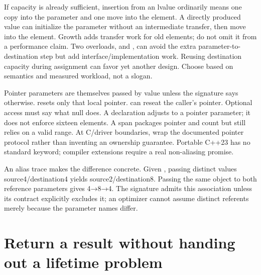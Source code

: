 If capacity is already sufficient, insertion from an lvalue ordinarily means one copy into the parameter and one move into the element. A directly produced value can initialize the parameter without an intermediate transfer, then move into the element. Growth adds transfer work for old elements; do not omit it from a performance claim. Two overloads,  and , can avoid the extra parameter-to-destination step but add interface/implementation work. Reusing destination capacity during assignment can favor yet another design. Choose based on semantics and measured workload, not a slogan.

Pointer parameters are themselves passed by value unless the signature says otherwise.  resets only that local pointer.  can reseat the caller's pointer. Optional access must say what null does. A declaration  adjusts to a pointer parameter; it does not enforce sixteen elements. A span packages pointer and count but still relies on a valid range. At C/driver boundaries, wrap the documented pointer protocol rather than inventing an ownership guarantee. Portable C++23 has no standard  keyword; compiler extensions require a real non-aliasing promise.

An alias trace makes the difference concrete. Given , passing distinct values source4/destination4 yields source2/destination8. Passing the same object to both reference parameters gives 4→8→4. The signature admits this association unless its contract explicitly excludes it; an optimizer cannot assume distinct referents merely because the parameter names differ.

\section{Return a result without handing out a lifetime problem}\label{05-engine-i-ch003-return-a-result-without-handing-out-a-lifetime-problem}

